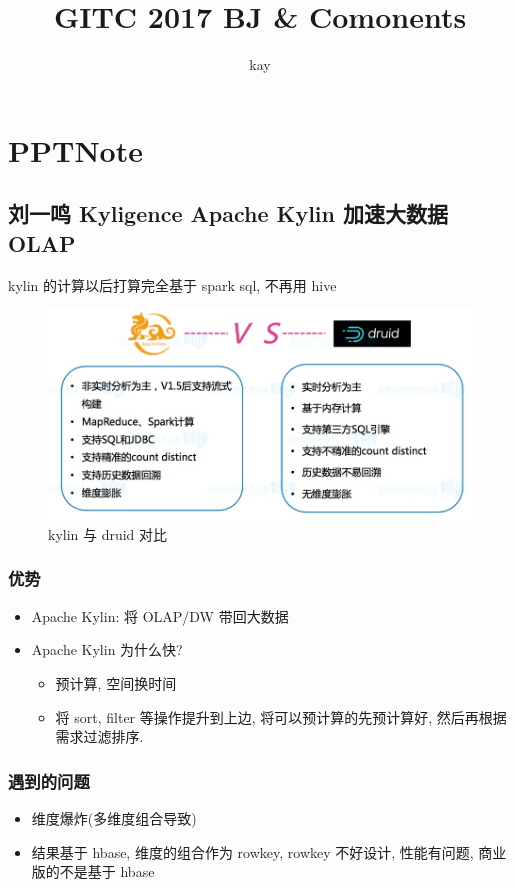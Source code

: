 \documentclass[hyperref, UTF-8]{ctexart}
\author{kay}
\title{GITC 2017 BJ \& Comonents}
\begin{document}
\maketitle
\tableofcontents

\section{PPTNote}
\label{sec:orgddc4c40}
\subsection{刘一鸣 Kyligence Apache Kylin 加速大数据 OLAP}
\label{sec:org2b59ba4}
\label{org6fb8a8c}
kylin 的计算以后打算完全基于 spark sql, 不再用 hive
\begin{figure}[htbp]
\centering
\includegraphics[width=.9\linewidth]{PPTNote/KylinVsDruid_2017-11-29_10-42-52.jpeg}
\caption{kylin 与 druid 对比}
\end{figure}
\subsubsection{优势}
\label{sec:org23a4a23}
\begin{itemize}
\item Apache Kylin: 将 OLAP/DW 带回大数据
\item Apache Kylin 为什么快?
\begin{itemize}
\item 预计算, 空间换时间
\item 将 sort, filter 等操作提升到上边, 将可以预计算的先预计算好, 然后再根据需求过滤排序.
\end{itemize}
\end{itemize}

\subsubsection{遇到的问题}
\label{sec:orgadd7d70}
\begin{itemize}
\item 维度爆炸(多维度组合导致)
\item 结果基于 hbase, 维度的组合作为 rowkey, rowkey 不好设计, 性能有问题, 商业版的不是基于 hbase
\end{itemize}
\end{document}
